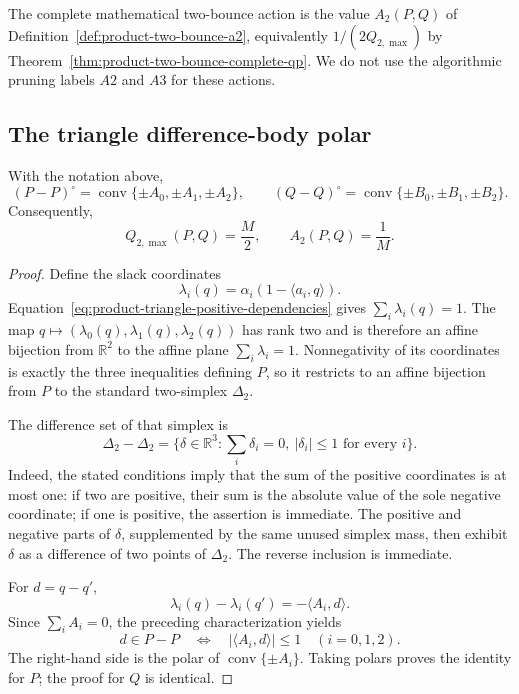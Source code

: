 The complete mathematical two-bounce action is the value
\(A_2(P,Q)\) of Definition~\ref{def:product-two-bounce-a2}, equivalently
\(1/(2Q_{2,\max})\) by
Theorem~\ref{thm:product-two-bounce-complete-qp}.  We do not use the
algorithmic pruning labels \(A2\) and \(A3\) for these actions.

\subsection{The triangle difference-body polar}
\label{subsec:product-triangle-difference-polar}

\begin{unverified}
\begin{lemma}
\label{lem:product-triangle-difference-polar}
With the notation above,
\[
 (P-P)^\circ=\operatorname{conv}\{\pm A_0,\pm A_1,\pm A_2\},
 \qquad
 (Q-Q)^\circ=\operatorname{conv}\{\pm B_0,\pm B_1,\pm B_2\}.
\]
Consequently,
\begin{equation}
\label{eq:product-triangle-a2-m}
 Q_{2,\max}(P,Q)=\frac M2,
 \qquad A_2(P,Q)=\frac1M.
\end{equation}
\end{lemma}

\begin{proof}
Define the slack coordinates
\[
 \lambda_i(q)=\alpha_i(1-\langle a_i,q\rangle).
\]
Equation~\eqref{eq:product-triangle-positive-dependencies} gives
\(\sum_i\lambda_i(q)=1\).  The map
\(q\mapsto(\lambda_0(q),\lambda_1(q),\lambda_2(q))\) has rank two and
is therefore an affine bijection from \(\mathbb R^2\) to the affine plane
\(\sum_i\lambda_i=1\).  Nonnegativity of its coordinates is exactly the
three inequalities defining \(P\), so it restricts to an affine bijection
from \(P\) to the standard two-simplex \(\Delta_2\).

The difference set of that simplex is
\[
 \Delta_2-\Delta_2
 =\{\delta\in\mathbb R^3:\sum_i\delta_i=0,
                              \ |\delta_i|\leq1\text{ for every }i\}.
\]
Indeed, the stated conditions imply that the sum of the positive coordinates
is at most one: if two are positive, their sum is the absolute value of the
sole negative coordinate; if one is positive, the assertion is immediate.
The positive and negative parts of \(\delta\), supplemented by the same
unused simplex mass, then exhibit \(\delta\) as a difference of two points of
\(\Delta_2\).  The reverse inclusion is immediate.

For \(d=q-q'\),
\[
 \lambda_i(q)-\lambda_i(q')=-\langle A_i,d\rangle.
\]
Since \(\sum_i A_i=0\), the preceding characterization yields
\[
 d\in P-P
 \quad\Longleftrightarrow\quad
 |\langle A_i,d\rangle|\leq1\quad(i=0,1,2).
\]
The right-hand side is the polar of
\(\operatorname{conv}\{\pm A_i\}\).  Taking polars proves the identity for
\(P\); the proof for \(Q\) is identical.


\end{proof}
\end{unverified}
